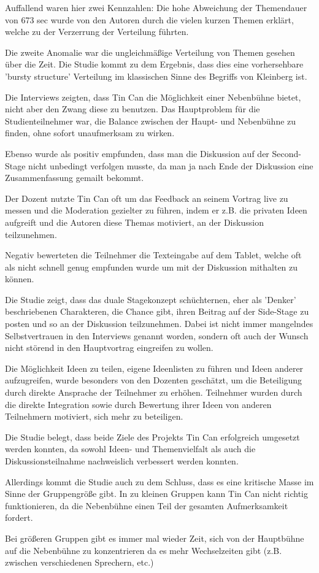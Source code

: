 Auffallend waren hier zwei Kennzahlen: Die hohe Abweichung der Themendauer von
673  sec wurde von den Autoren durch die vielen kurzen Themen erklärt, welche zu
der Verzerrung der Verteilung führten.

Die zweite Anomalie war die ungleichmäßige Verteilung von Themen gesehen über
die Zeit. Die Studie kommt zu dem Ergebnis, dass dies eine vorhersehbare 'bursty
structure' Verteilung im klassischen Sinne des Begriffs von Kleinberg
\cite{Klei2003} ist.

Die Interviews zeigten, dass Tin Can die Möglichkeit einer Nebenbühne bietet,
nicht aber den Zwang diese zu benutzen. Das Hauptproblem für die
Studienteilnehmer war, die Balance zwischen der Haupt- und Nebenbühne zu finden,
ohne sofort unaufmerksam zu wirken.

Ebenso wurde als positiv empfunden, dass man die Diskussion auf der Second-Stage
nicht unbedingt verfolgen musste, da man ja nach Ende der Diskussion eine
Zusammenfassung gemailt bekommt.

Der Dozent nutzte Tin Can oft um das Feedback an seinem Vortrag live zu messen
und die Moderation gezielter zu führen, indem er z.B. die privaten Ideen
aufgreift und die Autoren diese Themas motiviert, an der Diskussion teilzunehmen.

Negativ bewerteten die Teilnehmer die Texteingabe auf dem Tablet, welche oft
als nicht schnell genug empfunden wurde um mit der Diskussion mithalten zu können.

Die Studie zeigt, dass das duale Stagekonzept schüch\-ter\-nen, eher als 'Denker'
beschriebenen Charakteren, die Chance gibt, ihren Beitrag auf der Side-Stage zu
posten und so an der Diskussion teilzunehmen. Dabei ist nicht immer mangelndes
Selbstvertrauen in den Interviews genannt worden, sondern oft auch der Wunsch
nicht störend in den Hauptvortrag eingreifen zu wollen.

Die Möglichkeit Ideen zu teilen, eigene Ideenlisten zu füh\-ren und Ideen
anderer aufzugreifen, wurde besonders von den Dozenten geschätzt, um die Beteiligung durch
direkte Ansprache der Teilnehmer zu erhöhen. Teilnehmer wurden durch die direkte
Integration sowie durch Bewertung ihrer Ideen von anderen Teilnehmern
motiviert, sich mehr zu beteiligen.

Die Studie belegt, dass beide Ziele des Projekts Tin Can erfolgreich umgesetzt
werden konnten, da sowohl Ideen- und Themenvielfalt als auch die
Diskussionsteilnahme nachweislich verbessert werden konnten.

Allerdings kommt die Studie auch zu dem Schluss, dass es eine kritische Masse im
Sinne der Gruppengröße gibt. In zu kleinen Gruppen kann Tin Can nicht richtig
funktionieren, da die Nebenbühne einen Teil der gesamten Aufmerksamkeit fordert.

Bei größeren Gruppen gibt es immer mal wieder Zeit, sich von der Hauptbühne auf
die Nebenbühne zu konzentrieren da es mehr Wechselzeiten gibt (z.B. zwischen
verschiedenen Sprechern, etc.)





